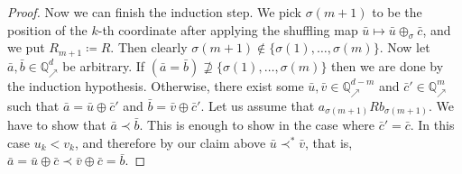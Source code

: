 \documentclass{amsart}
\theoremstyle{definition}
\newtheorem{corollary}[theorem]{Corollary}
\newtheorem{notation}[theorem]{Notation}
\theoremstyle{remark}
\numberwithin{equation}{section}
\newcommand\qup[1]{\mathbb{Q}_\nearrow^{#1}}
\newcommand{\shuff}{\oplus}
\begin{document}
\begin{proof}
	Now we can finish the induction step. We pick $\sigma({m+1})$ to be the position of the $k$-th coordinate after applying the shuffling map $\bar{u}\mapsto \bar{u}\shuff_{\sigma}\bar{c}$, and we put $R_{m+1}\coloneqq R$. Then clearly $\sigma(m+1) \not\in \{\sigma(1),\dots,\sigma(m)\}$. Now let $\bar{a},\bar{b}\in \qup{d}$ be arbitrary. If $(\bar{a}=\bar{b})\not\supseteq \{\sigma(1),\dots,\sigma(m)\}$ then we are done by the induction hypothesis. Otherwise, there exist some $\bar{u},\bar{v}\in \qup{d-m}$ and $\bar{c}'\in \qup{m}$ such that $\bar{a}=\bar{u}\shuff \bar{c}'$ and $\bar{b}=\bar{v}\shuff \bar{c}'$. Let us assume that $a_{\sigma(m+1)}Rb_{\sigma(m+1)}$. We have to show that $\bar{a}\prec \bar{b}$. This is enough to show in the case where  $\bar{c}'=\bar{c}$. In this case $u_k<v_k$, and therefore by our claim above $\bar{u}\prec^*\bar{v}$, that is, $\bar{a}=\bar{u}\shuff \bar{c}\prec \bar{v}\shuff \bar{c}=\bar{b}$.
\end{proof}

\end{document}
